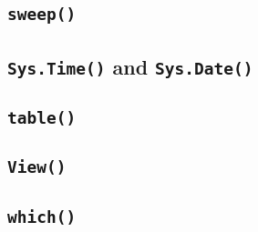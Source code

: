 \documentclass[a4paper,12pt]{article}
\begin{document}
\subsection{\texttt{sweep()}}
\subsection{\texttt{Sys.Time()} and \texttt{Sys.Date()} }
\subsection{\texttt{table()}}
\subsection{\texttt{View()}}
\subsection{\texttt{which()}}
\newpage
\end{document}
